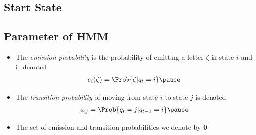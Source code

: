 
\begin{slide}
\section{Start State}
\pause
{}
\pb
\begin{center}
  \pause
\end{center}
\end{slide}


\begin{slide}
\section{Parameter of HMM}

\begin{PauseHighLight}
  \begin{itemize}
  \item The \emph{emission probability} is the probability of emitting a
    letter $\zeta$ in state $i$ and is denoted
    \begin{align*}
       e_i(\zeta) = \Prob{\zeta | q_t=i} \pause
    \end{align*}
  \item The \emph{transition probability} of moving from state $i$ to
    state $j$ is denoted
    \begin{align*}
      a_{ij} = \Prob{q_t=j | q_{t-1} = i}\pause
    \end{align*}
  \item The set of emission and transition probabilities we denote by
    $\bm{\theta}$\pause 
  \end{itemize}
\end{PauseHighLight}

\end{slide}


